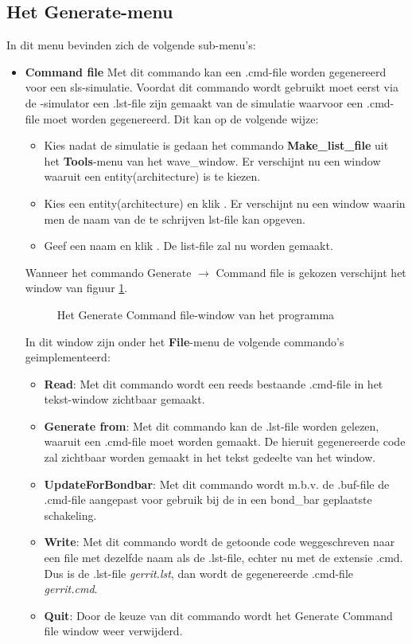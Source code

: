 \subsection{Het Generate-menu}
In dit menu bevinden zich de volgende sub-menu's:
\begin{itemize}
\item{\bf Command file}
Met dit commando kan een .cmd-file worden gegenereerd voor een sls-simulatie.
Voordat dit commando wordt gebruikt moet eerst via de -simulator
een .lst-file zijn gemaakt van de simulatie waarvoor een .cmd-file moet
worden gegenereerd.
Dit kan op de volgende wijze:
\begin{itemize}
\item Kies nadat de simulatie is gedaan het commando {\bf Make\_list\_file} uit het
      {\bf Tools}-menu van het wave\_window. Er verschijnt nu een window waaruit
      een entity(architecture) is te kiezen.
\item Kies een entity(architecture) en klik . Er verschijnt nu een window
      waarin men de naam van de te schrijven lst-file kan opgeven.
\item Geef een naam en klik . De list-file zal nu worden gemaakt.
\end{itemize}

Wanneer het commando Generate $\rightarrow$ Command file is gekozen verschijnt het window van
figuur \ref{mk-cmd-window}.

\begin{figure}[htb]
\centerline{}
\caption{Het Generate Command file-window van het programma }
\label{mk-cmd-window}
\end{figure}

In dit window zijn onder het {\bf File}-menu de volgende commando's geimplementeerd:
\begin{itemize}
\item {\bf Read}: Met dit commando wordt een reeds bestaande .cmd-file in het
	tekst-window zichtbaar gemaakt.
\item {\bf Generate from}: Met dit commando kan de .lst-file worden gelezen, waaruit een
            .cmd-file moet worden gemaakt. De hieruit gegenereerde code
            zal zichtbaar worden gemaakt in het tekst gedeelte van het
            window.
\item {\bf UpdateForBondbar}: Met dit commando wordt m.b.v. de .buf-file de .cmd-file
             aangepast voor gebruik bij de in een bond\_bar
             geplaatste schakeling.
\item {\bf Write}: Met dit commando wordt de getoonde code weggeschreven naar een
             file met dezelfde naam als de .lst-file, echter nu met de
             extensie .cmd. Dus is de .lst-file {\it gerrit.lst}, dan wordt
             de gegenereerde .cmd-file {\it gerrit.cmd}.
\item {\bf Quit}: Door de keuze van dit commando wordt het Generate Command file window
              weer verwij\-derd.
\end{itemize}


\end{itemize}
